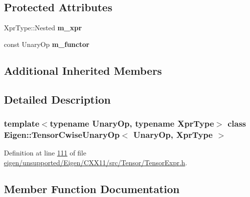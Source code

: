 \subsection*{Protected Attributes}
\begin{DoxyCompactItemize}
\item 
\mbox{\label{class_eigen_1_1_tensor_cwise_unary_op_a0821e6d8d38c7187aed4de20b00ccb81}} 
Xpr\+Type\+::\+Nested {\bfseries m\+\_\+xpr}
\item 
\mbox{\label{class_eigen_1_1_tensor_cwise_unary_op_a0abaf304aac7003e1560778e6639b56c}} 
const Unary\+Op {\bfseries m\+\_\+functor}
\end{DoxyCompactItemize}
\subsection*{Additional Inherited Members}


\subsection{Detailed Description}
\subsubsection*{template$<$typename Unary\+Op, typename Xpr\+Type$>$\newline
class Eigen\+::\+Tensor\+Cwise\+Unary\+Op$<$ Unary\+Op, Xpr\+Type $>$}



Definition at line \hyperlink{eigen_2unsupported_2_eigen_2_c_x_x11_2src_2_tensor_2_tensor_expr_8h_source_l00111}{111} of file \hyperlink{eigen_2unsupported_2_eigen_2_c_x_x11_2src_2_tensor_2_tensor_expr_8h_source}{eigen/unsupported/\+Eigen/\+C\+X\+X11/src/\+Tensor/\+Tensor\+Expr.\+h}.



\subsection{Member Function Documentation}
\mbox{\label{class_eigen_1_1_tensor_cwise_unary_op_af3a260b2117072817e641d72038cce51}} 
